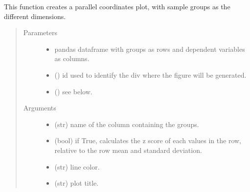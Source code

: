 \documentclass[letterpaper,10pt,english]{sphinxmanual}
\begin{document}

\begin{fulllineitems}
\label{\detokenize{_autosummary/analytics_core.viz:analytics_core.viz.viz.get_parallel_plot}}
This function creates a parallel coordinates plot, with sample groups as the different dimensions.
\begin{quote}\begin{description}
\item[{Parameters}] \leavevmode\begin{itemize}
\item {} 
 \textendash{} pandas dataframe with groups as rows and dependent variables as columns.

\item {} 
 () \textendash{} id used to identify the div where the figure will be generated.

\item {} 
 () \textendash{} see below.

\end{itemize}

\item[{Arguments}] \leavevmode\begin{itemize}
\item {} 
 (str) \textendash{} name of the column containing the groups.

\item {} 
 (bool) \textendash{} if True, calculates the z score of each values in the row, relative to the row mean and standard deviation.

\item {} 
 (str) \textendash{} line color.

\item {} 
 (str) \textendash{} plot title.


\end{itemize}
\end{description}
\end{quote}
\end{fulllineitems}
\end{document}
